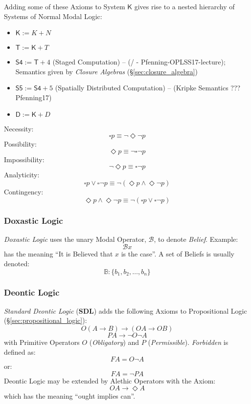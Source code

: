 Adding some of these Axioms to System $\mathsf{K}$ gives rise to a
nested hierarchy of Systems of Normal Modal Logic:
\begin{itemize}
  \item $\mathsf{K} := K + N$
  \item $\mathsf{T} := \mathsf{K} + T$
  \item $\mathsf{S4} := \mathsf{T} + 4$ (Staged Computation)
    \cite{wadler14} -- (/ -
    Pfenning-OPLSS17-lecture); Semantics given by \emph{Closure Algebras}
    (\S\ref{sec:closure_algebra})
  \item $\mathsf{S5} := \mathsf{S4} + 5$
    (Spatially Distributed Computation) \cite{wadler14} -- (Kripke
    Semantics ??? Pfenning17)
  \item $\mathsf{D} := \mathsf{K} + D$
\end{itemize}

Necessity:
\[
  \square p \equiv \neg \Diamond \neg p
\]
Possibility:
\[
  \Diamond p \equiv \neg \square \neg p
\]
Impossibility:
\[
  \neg \Diamond p \equiv \square \neg p
\]
Analyticity:
\[
  \square p \vee \square \neg p
  \equiv \neg (\Diamond p \wedge \Diamond \neg p)
\]
Contingency:
\[
  \Diamond p \wedge \Diamond \neg p
  \equiv \neg (\square p \vee \square \neg p)
\]



\subsubsection{Doxastic Logic}\label{sec:doxastic_logic}

\emph{Doxastic Logic} uses the unary Modal Operator, $\mathcal{B}$, to
denote \emph{Belief}. Example:
\[
  \mathcal{B} x
\]
has the meaning ``It is Believed that $x$ is the case''. A set of
Beliefs is usually denoted:
\[
  \mathbb{B}: \{ b_1, b_2, \ldots, b_n \}
\]



\subsubsection{Deontic Logic}\label{sec:deontic_logic}

\emph{Standard Deontic Logic} ($\mathbf{SDL}$) adds the following
Axioms to Propositional Logic (\S\ref{sec:propositional_logic}):
\[
  O(A \rightarrow B) \rightarrow (OA \rightarrow OB)
\]
\[
  PA \rightarrow \neg O \neg A
\]
with Primitive Operators $O$ (\emph{Obligatory}) and $P$
(\emph{Permissible}). \emph{Forbidden} is defined as:
\[
  FA = O \neg A
\]
or:
\[
  FA = \neg P A
\]
Deontic Logic may be extended by Alethic Operators with the Axiom:
\[
  OA \rightarrow \Diamond A
\]
which has the meaning ``ought implies can''.



